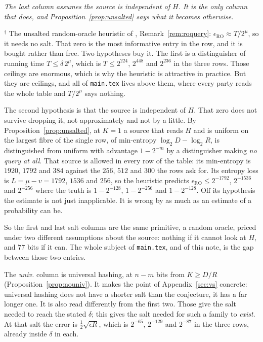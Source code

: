 \documentclass{aicr-solution}
\begin{document}
\noindent\emph{The last column assumes the source is independent of $H$. It is the only column that
does, and Proposition~\ref{prop:unsalted} says what it becomes otherwise.}

\smallskip
\noindent$^{\dagger}$ The unsalted random-oracle heuristic of \cite{BDKPPSY11}, Remark~\ref{rem:roquery}:
$\epsilon_{\mathrm{RO}} \approx T/2^{\mu}$, so it needs no salt. That zero is the most informative
entry in the row, and it is bought rather than free. Two hypotheses buy it. The first is a
distinguisher of running time $T \le \delta\,2^{\mu}$, which is $T \le 2^{224}$, $2^{448}$ and
$2^{236}$ in the three rows. Those ceilings are enormous, which is why the heuristic is attractive
in practice. But they are ceilings, and all of \texttt{main.tex} lives above them, where every
party reads the whole table and $T/2^{\mu}$ says nothing.

The second hypothesis is that the source is independent of $H$. That zero does not survive dropping
it, not approximately and not by a little. By Proposition~\ref{prop:unsalted}, at $K = 1$ a source
that reads $H$ and is uniform on the largest fibre of the single row, of min-entropy
$\log_2 D - \log_2 R$, is distinguished from uniform with advantage $1 - 2^{-m}$ by a distinguisher
making \emph{no query at all}. That source is allowed in every row of the table: its min-entropy is
$1920$, $1792$ and $384$ against the $256$, $512$ and $300$ the rows ask for. Its entropy loss is
$L = \mu - v = 1792$, $1536$ and $256$, so the heuristic predicts
$\epsilon_{\mathrm{RO}} \le 2^{-1792}$, $2^{-1536}$ and $2^{-256}$ where the truth is
$1 - 2^{-128}$, $1 - 2^{-256}$ and $1 - 2^{-128}$. Off its hypothesis the estimate is not just
inapplicable. It is wrong by as much as an estimate of a probability can be.

So the first and last salt columns are the same primitive, a random oracle, priced under two
different assumptions about the source: nothing if it cannot look at $H$, and $77$ bits if it can.
The whole subject of \texttt{main.tex}, and of this note, is the gap between those two entries.

The \emph{univ.} column is universal hashing, at $n - m$ bits from $K \ge D/R$
(Proposition~\ref{prop:nouniv}). It makes the point of Appendix~\ref{sec:vs} concrete: universal
hashing does not have a shorter salt than the conjecture, it has a far longer one. It is also read
differently from the first two. Those give the salt needed to reach the stated $\delta$; this gives
the salt needed for such a family to \emph{exist}. At that salt the error is
$\tfrac12\sqrt{\epsilon R}$, which is $2^{-65}$, $2^{-129}$ and $2^{-87}$ in the three rows, already
inside $\delta$ in each.
\end{document}
